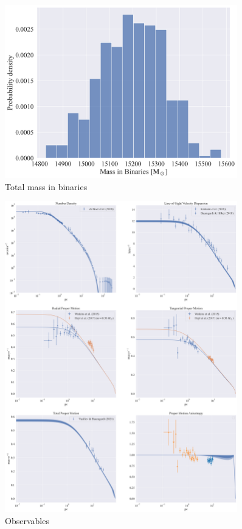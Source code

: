 \begin{figure}
	\begin{center}
		\includegraphics[width=0.9\textwidth]{figures/low_bin_model/binary_mass.png}
	\end{center}
	\caption{Total mass in binaries}
	\label{fig:low_bin_model_binary_mass}
\end{figure}

\begin{figure}
	\begin{center}
		\includegraphics[width=0.9\textwidth]{figures/low_bin_model/obs_panel.png}
	\end{center}
	\caption{Observables}
	\label{fig:low_bin_model_obs_panel}
\end{figure}




